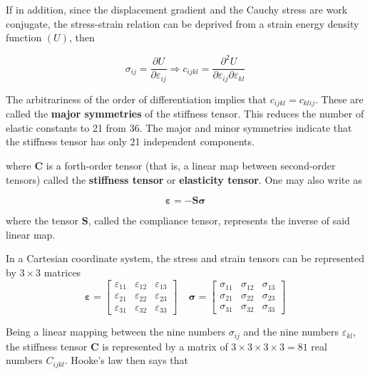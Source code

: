 If in addition, since the displacement gradient and the Cauchy stress are work conjugate, the stress-strain relation can be deprived from a strain energy density function $ (U) $, then

\begin{equation}
\sigma_{ij} = \dfrac{\partial U}{\partial \varepsilon_{ij}} \Longrightarrow c_{ijkl} = \dfrac{\partial^2 U}{\partial \varepsilon_{ij} \partial \varepsilon_{kl} }
\end{equation}

The arbitrariness of the order of differentiation implies that $ c_{ijkl} = c_{klij} $. These are called the \textbf{major symmetries} of the stiffness tensor. This reduces the number of elastic constants to 21 from 36. The major and minor symmetries indicate that the stiffness tensor has only 21 independent components.

where $ \mathbf{C} $ is a forth-order tensor (that is, a linear map between second-order tensors) called the \textbf{stiffness tensor} or \textbf{elasticity tensor}. One may also write as

\begin{equation}
\mathbf{\varepsilon} = -\mathbf{S} \mathbf{\sigma}
\end{equation}

where the tensor $ \mathbf{S} $, called the compliance tensor, represents the inverse of said linear map.

In a Cartesian coordinate system, the stress and strain tensors can be represented by $ 3 \times 3 $ matrices
\begin{equation}
\mathbf{\varepsilon} = \begin{bmatrix}
\varepsilon_{11} & \varepsilon_{12} & \varepsilon_{13} \\
\varepsilon_{21} & \varepsilon_{22} & \varepsilon_{23} \\
\varepsilon_{31} & \varepsilon_{32} & \varepsilon_{33}
\end{bmatrix}~~~~~ \mathbf{\sigma} = \begin{bmatrix}
\sigma_{11} & \sigma_{12} & \sigma_{13} \\
\sigma_{21} & \sigma_{22} & \sigma_{23} \\
\sigma_{31} & \sigma_{32} & \sigma_{33}
\end{bmatrix}
\end{equation}

Being a linear mapping between the nine numbers $ \sigma_{ij} $ and the nine numbers $ \varepsilon_{kl} $, the stiffness tensor $ \mathbf{C} $ is represented by a matrix of $ 3 \times 3 \times 3 \times 3 = 81 $ real numbers $ C_{ijkl} $. Hooke's law then says that

